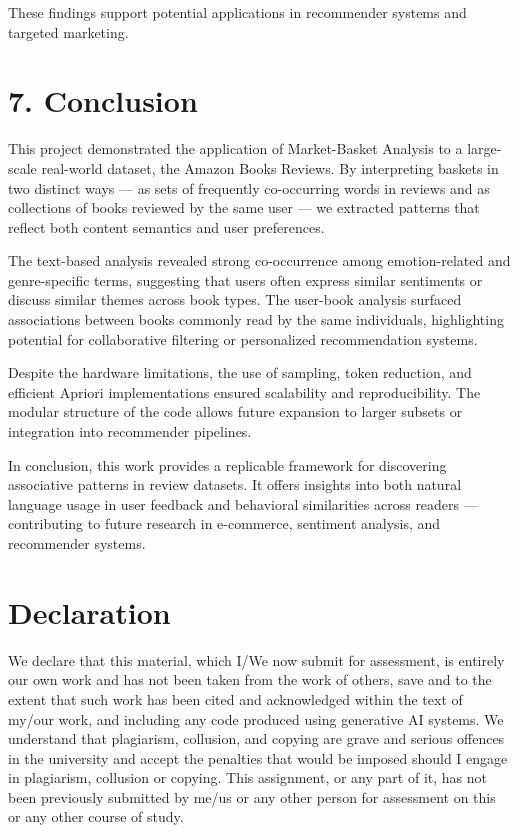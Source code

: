 \documentclass{article}
\begin{document}
These findings support potential applications in recommender systems and targeted marketing.

\section*{7. Conclusion}

This project demonstrated the application of Market-Basket Analysis to a large-scale real-world dataset, the Amazon Books Reviews. By interpreting baskets in two distinct ways — as sets of frequently co-occurring words in reviews and as collections of books reviewed by the same user — we extracted patterns that reflect both content semantics and user preferences.

The text-based analysis revealed strong co-occurrence among emotion-related and genre-specific terms, suggesting that users often express similar sentiments or discuss similar themes across book types. The user-book analysis surfaced associations between books commonly read by the same individuals, highlighting potential for collaborative filtering or personalized recommendation systems.

Despite the hardware limitations, the use of sampling, token reduction, and efficient Apriori implementations ensured scalability and reproducibility. The modular structure of the code allows future expansion to larger subsets or integration into recommender pipelines.

In conclusion, this work provides a replicable framework for discovering associative patterns in review datasets. It offers insights into both natural language usage in user feedback and behavioral similarities across readers — contributing to future research in e-commerce, sentiment analysis, and recommender systems.


\section*{Declaration}

We declare that this material, which I/We now submit for assessment, is entirely our own work and has not been taken from the work of others, save and to the extent that such work has been cited and acknowledged within the text of my/our work, and including any code produced using generative AI systems. We understand that plagiarism, collusion, and copying are grave and serious offences in the university and accept the penalties that would be imposed should I engage in plagiarism, collusion or copying. This assignment, or any part of it, has not been previously submitted by me/us or any other person for assessment on this or any other course of study.
\end{document}
